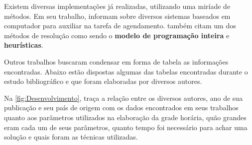 

Existem diversas implementações já realizadas, utilizando uma miríade de métodos. Em seu trabalho,  informam sobre diversos sistemas baseados em computador para auxiliar na tarefa de agendamento.  também citam um dos métodos de resolução como sendo o \textbf{modelo de programação inteira} e \textbf{heurísticas}.

Outros trabalhos buscaram condensar em forma de tabela as informações encontradas. Abaixo estão dispostas algumas das tabelas encontradas durante o estudo bibliográfico e que foram elaboradas por diversos autores.

Na \autoref{fig:Desenvolvimento},  traça a relação entre os diversos autores, ano de sua publicação e seu país de origem com os dados encontrados em seus trabalhos quanto aos parâmetros utilizados na elaboração da grade horária, quão grandes eram cada um de seus parâmetros, quanto tempo foi necessário para achar uma solução e quais foram as técnicas utilizadas.


